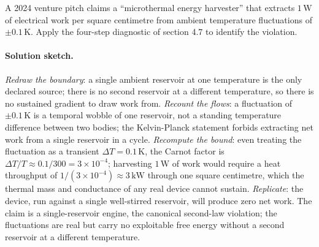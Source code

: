 \begin{exercise}
A 2024 venture pitch claims a ``microthermal energy harvester'' that
extracts $1\,\text{W}$ of electrical work per square centimetre from
ambient temperature fluctuations of $\pm 0.1\,\si{\kelvin}$. Apply
the four-step diagnostic of section 4.7 to identify the violation.

\paragraph{Solution sketch.} \emph{Redraw the boundary}: a single
ambient reservoir at one temperature is the only declared source; there
is no second reservoir at a different temperature, so there is no
sustained gradient to draw work from. \emph{Recount the flows}: a
fluctuation of $\pm 0.1\,\si{\kelvin}$ is a temporal wobble of one
reservoir, not a standing temperature difference between two bodies;
the Kelvin-Planck statement forbids extracting net work from a single
reservoir in a cycle. \emph{Recompute the bound}: even treating the
fluctuation as a transient $\Delta T = 0.1\,\si{\kelvin}$, the Carnot
factor is $\Delta T/T \approx 0.1/300 = 3\times10^{-4}$; harvesting
$1\,\text{W}$ of work would require a heat throughput of
$1/(3\times10^{-4}) \approx 3\,\text{kW}$ through one square centimetre,
which the thermal mass and conductance of any real device cannot
sustain. \emph{Replicate}: the device, run against a single
well-stirred reservoir, will produce zero net work. The claim is a
single-reservoir engine, the canonical second-law violation; the
fluctuations are real but carry no exploitable free energy without a
second reservoir at a different temperature.
\end{exercise}

